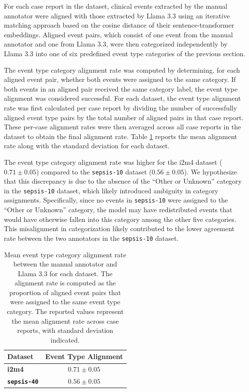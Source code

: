 \documentclass[pmlr,twocolumn,10pt]{jmlr} %
\begin{document}
For each case report in the dataset, clinical events extracted by the manual annotator were aligned with those extracted by Llama 3.3 using an iterative matching approach based on the cosine distance of their sentence-transformer embeddings.  
Aligned event pairs, which consist of one event from the manual annotator and one from Llama 3.3, were then categorized independently by Llama 3.3 into one of six predefined event type categories of the previous section.  

The event type category alignment rate was computed by determining, for each aligned event pair, whether both events were assigned to the same category.  
If both events in an aligned pair received the same category label, the event type alignment was considered successful.  
For each dataset, the event type alignment rate was first calculated per case report by dividing the number of successfully aligned event type pairs by the total number of aligned pairs in that case report.  
These per-case alignment rates were then averaged across all case reports in the dataset to obtain the final alignment rate.  
Table \ref{tab:event_category_alignment} reports the mean alignment rate along with the standard deviation for each dataset. 

The event type category alignment rate was higher for the i2m4 dataset ($0.71 \pm 0.05$) compared to the \texttt{sepsis-10} dataset ($0.56 \pm 0.05$).  
We hypothesize that this discrepancy is due to the absence of the ``Other or Unknown'' category in the \texttt{sepsis-10} dataset, which likely introduced ambiguity in category assignments.  
Specifically, since no events in \texttt{sepsis-10} were assigned to the ``Other or Unknown'' category, the model may have redistributed events that would have otherwise fallen into this category among the other five categories.  
This misalignment in categorization likely contributed to the lower agreement rate between the two annotators in the \texttt{sepsis-10} dataset.  

\begin{table}[ht]
\centering
\begin{tabular}{|l|c|}
\hline
\textbf{Dataset} & \textbf{Event Type Alignment} \\ \hline
\textbf{i2m4}    & $0.71\pm0.05 $                       \\ \hline
\textbf{\texttt{sepsis-40}} & $0.56\pm0.05$                      \\ \hline
\end{tabular}
\caption{Mean event type category alignment rate between the manual annotator and Llama 3.3 for each dataset.  
The alignment rate is computed as the proportion of aligned event pairs that were assigned to the same event type category.  
The reported values represent the mean alignment rate across case reports, with standard deviation indicated.}
\label{tab:event_category_alignment}
\end{table}
\end{document}
